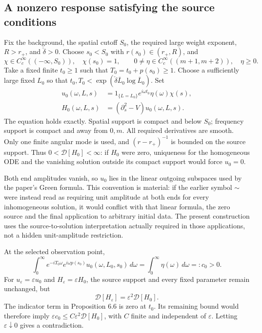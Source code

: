 \documentclass[10pt]{article}
\begin{document}
\subsection*{A nonzero response satisfying the source conditions}
Fix the background, the spatial cutoff \(S_0\), the required large weight exponent, \(R>r_+\), and \(\check\delta>0\). Choose \(s_0<S_0\) with \(r(s_0)\in(r_+,R)\), and \[\chi\in C_c^\infty((-\infty,S_0)),\quad \chi(s_0)=1,\qquad
 0\ne\eta\in C_c^\infty((m+1,m+2)),\quad\eta\geq0.\] Take a fixed finite \(t_0\geq1\) such that \(T_0=t_0+p(s_0)\geq1\). Choose a sufficiently large fixed \(L_0\) so that \(t_0,T_0<\exp(\check\delta\bar L_0\log\bar L_0)\). Set \[\begin{split}
 u_0(\omega,L,s)&=1_{\{L=L_0\}}
                 e^{i\omega t_0}\eta(\omega)\chi(s),\\
 H_0(\omega,L,s)&=(\partial_s^2-V)u_0(\omega,L,s).
 \end{split}\] The equation holds exactly. Spatial support is compact and below \(S_0\); frequency support is compact and away from \(0,m\). All required derivatives are smooth. Only one finite angular mode is used, and \((r-r_+)^{-1}\) is bounded on the source support. Thus \(0<\mathcal D[H_0]<\infty\): if \(H_0\) were zero, uniqueness for the homogeneous ODE and the vanishing solution outside its compact support would force \(u_0=0\).\par
Both end amplitudes vanish, so \(u_0\) lies in the linear outgoing subspaces used by the paper’s Green formula. This convention is material: if the earlier symbol \(\sim\) were instead read as requiring unit amplitude at both ends for every inhomogeneous solution, it would conflict with that linear formula, the zero source and the final application to arbitrary initial data. The present construction uses the source-to-solution interpretation actually required in those applications, not a hidden unit-amplitude restriction.\par
At the selected observation point, \[\int_0^\infty e^{-iT_0\omega}e^{i\omega p(s_0)}
       u_0(\omega,L_0,s_0)\,d\omega
   =\int_0^\infty\eta(\omega)\,d\omega=:c_0>0.\] For \(u_\varepsilon=\varepsilon u_0\) and \(H_\varepsilon=\varepsilon H_0\), the source support and every fixed parameter remain unchanged, but \[\mathcal D[H_\varepsilon]=\varepsilon^2\mathcal D[H_0].\] The indicator term in Proposition 6.6 is zero at \(t_0\). Its remaining bound would therefore imply \(\varepsilon c_0\leq C\varepsilon^2\mathcal D[H_0]\), with \(C\) finite and independent of \(\varepsilon\). Letting \(\varepsilon\downarrow0\) gives a contradiction.\par
\end{document}
